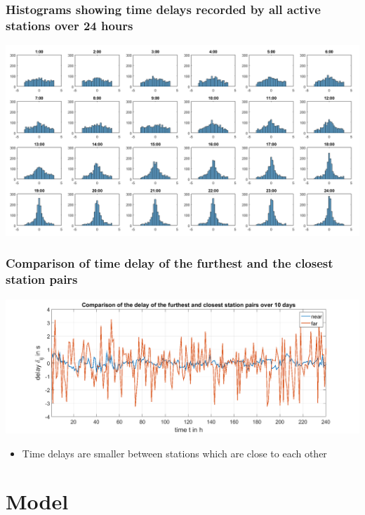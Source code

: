 \documentclass{beamer}
\begin{document}
\begin{frame}
\frametitle{Histograms showing time delays recorded by all active stations over 24 hours}
\includegraphics[width=\textwidth]{../figures/hourlydelaydistributionoverallstationsforoneday.png}
\end{frame}

\begin{frame}
\frametitle{Comparison of time delay of the furthest and the closest station pairs}
\includegraphics[width=\textwidth]{../figures/Comparisondelayoverrandomdayoffarestandclosestlinks_presentation.png}

\begin{itemize}
\item Time delays are smaller between stations which are close to each other
\end{itemize}
\end{frame}

\section{Model}
\end{document}
